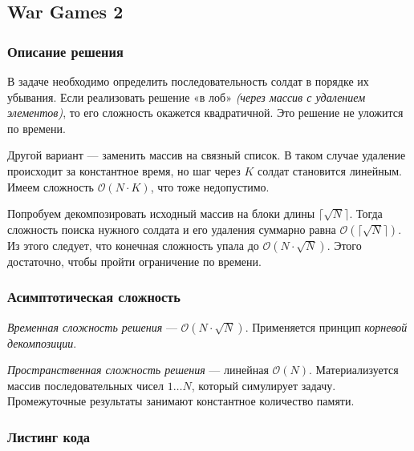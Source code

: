 \subsection{War Games 2}

\subsubsection{Описание решения}

В задаче необходимо определить последовательность солдат в порядке их убывания. Если реализовать решение «в лоб» \textit{(через массив с удалением элементов)}, то его сложность окажется квадратичной. Это решение не уложится по времени.

Другой вариант --- заменить массив на связный список. В таком случае удаление происходит за константное время, но шаг через \( K \) солдат становится линейным. Имеем сложность \( \mathcal{O}(N\cdot K) \), что тоже недопустимо.

Попробуем декомпозировать исходный массив на блоки длины \( \lceil \sqrt{N} \rceil \). Тогда сложность поиска нужного солдата и его удаления суммарно равна \( \mathcal{O}(\lceil \sqrt{N} \rceil) \). Из этого следует, что конечная сложность упала до \( \mathcal{O}(N\cdot\sqrt{N}) \). Этого достаточно, чтобы пройти ограничение по времени.

\subsubsection{Асимптотическая сложность}

\textit{Временная сложность решения} --- \( \mathcal{O}(N\cdot\sqrt{N}) \). Применяется принцип \textit{корневой декомпозиции}.

\textit{Пространственная сложность решения} --- линейная \( \mathcal{O}(N) \). Материализуется массив последовательных чисел \( 1\ldots N \), который симулирует задачу. Промежуточные результаты занимают константное количество памяти.

\subsubsection{Листинг кода}

